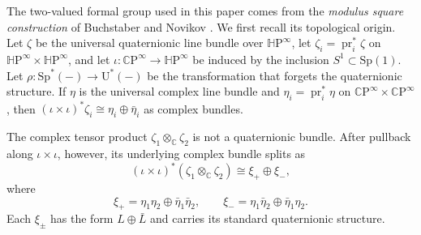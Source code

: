 \documentclass[14pt,dvipsnames]{extarticle}
\numberwithin{equation}{subsection}
\theoremstyle{plain}
\theoremstyle{definition}
\theoremstyle{definition}
\DeclareMathOperator{\pr}{pr}
\newcommand{\U}{\mathrm U}
\newcommand{\CP}{\mathbb{C}\mathrm P}
\newcommand{\HP}{\mathbb{H}\mathrm P}
\newcommand{\Sp}{\mathrm{Sp}}
\begin{document}
The two-valued formal group used in this paper comes from the
\emph{modulus square construction} of Buchstaber and Novikov \cite{BN71}.
We first recall its topological origin. Let $\zeta$ be the universal
quaternionic line bundle over $\HP^\infty$, let
$\zeta_i=\pr_i^*\zeta$ on $\HP^\infty\times\HP^\infty$, and let
$\iota\colon\CP^\infty\to\HP^\infty$ be induced by the inclusion
$S^1\subset\Sp(1)$. Let
$\rho\colon\Sp^*(-)\to\U^*(-)$ be the transformation that forgets the
quaternionic structure. If $\eta$ is the universal complex line bundle and
$\eta_i=\pr_i^*\eta$ on $\CP^\infty\times\CP^\infty$, then
$(\iota\times\iota)^*\zeta_i\cong\eta_i\oplus\bar\eta_i$ as complex bundles.

The complex tensor product $\zeta_1\otimes_{\mathbb C}\zeta_2$ is not a
quaternionic bundle. After pullback along $\iota\times\iota$, however, its underlying complex
bundle splits as
\[
 (\iota\times\iota)^*(\zeta_1\otimes_{\mathbb C}\zeta_2)
 \cong \xi_+\oplus\xi_-,
\]
where
\[
 \xi_+=\eta_1\eta_2\oplus\bar\eta_1\bar\eta_2,
 \qquad
 \xi_-=\eta_1\bar\eta_2\oplus\bar\eta_1\eta_2.
\]
Each $\xi_\pm$ has the form $L\oplus\bar L$ and carries its standard
quaternionic structure.
\end{document}
